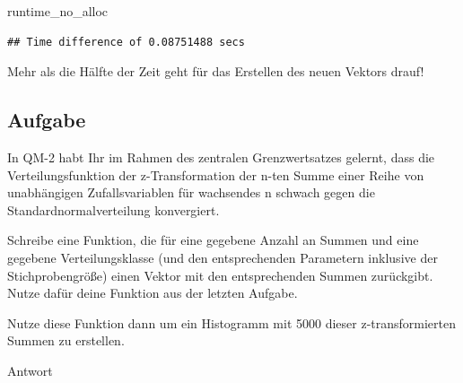 \documentclass[
]{book}
\newenvironment{Shaded}{\begin{snugshade}}{\end{snugshade}}
\newcommand{\NormalTok}[1]{#1}
\begin{document}
\begin{Shaded}
\begin{Highlighting}[]
\NormalTok{runtime\_no\_alloc}
\end{Highlighting}
\end{Shaded}

\begin{verbatim}
## Time difference of 0.08751488 secs
\end{verbatim}

Mehr als die Hälfte der Zeit geht für das Erstellen des neuen Vektors drauf!

\hypertarget{aufgabe-4}{%
\subsection{Aufgabe}\label{aufgabe-4}}

In QM-2 habt Ihr im Rahmen des zentralen Grenzwertsatzes gelernt, dass die Verteilungsfunktion der z-Transformation der n-ten Summe einer Reihe von unabhängigen Zufallsvariablen für wachsendes n schwach gegen die Standardnormalverteilung konvergiert.

Schreibe eine Funktion, die für eine gegebene Anzahl an Summen und eine gegebene Verteilungsklasse (und den entsprechenden Parametern inklusive der Stichprobengröße) einen Vektor mit den entsprechenden Summen zurückgibt.
Nutze dafür deine Funktion aus der letzten Aufgabe.

Nutze diese Funktion dann um ein Histogramm mit 5000 dieser z-transformierten Summen zu erstellen.

Antwort
\end{document}
